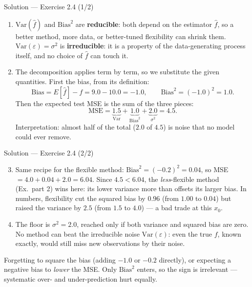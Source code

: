 \documentclass[aspectratio=169,11pt]{beamer}
\begin{document}
\begin{frame}{Solution --- Exercise 2.4 (1/2)}
\begin{solutionbox}
\begin{enumerate}
  \item $\mathrm{Var}(\hat f)$ and $\mathrm{Bias}^2$ are
        \textbf{reducible}: both depend on the estimator $\hat f$, so
        a better method, more data, or better-tuned flexibility can
        shrink them. $\mathrm{Var}(\varepsilon)=\sigma^2$ is
        \textbf{irreducible}: it is a property of the data-generating
        process itself, and no choice of $\hat f$ can touch it.
  \item The decomposition applies term by term, so we substitute the
        given quantities. First the bias, from its definition:
        \[
          \mathrm{Bias}=E[\hat f]-f=9.0-10.0=-1.0,
          \qquad \mathrm{Bias}^2=(-1.0)^2=1.0.
        \]
        Then the expected test MSE is the sum of the three pieces:
        \[
          \text{MSE}=\underbrace{1.5}_{\text{Var}}
          +\underbrace{1.0}_{\text{Bias}^2}
          +\underbrace{2.0}_{\sigma^2}=4.5.
        \]
        Interpretation: almost half of the total ($2.0$ of $4.5$) is
        noise that no model could ever remove.
\end{enumerate}
\end{solutionbox}
\end{frame}

\begin{frame}{Solution --- Exercise 2.4 (2/2)}
\begin{solutionbox}
\begin{enumerate}\setcounter{enumi}{2}
  \item Same recipe for the flexible method:
        $\mathrm{Bias}^2=(-0.2)^2=0.04$, so
        MSE $=4.0+0.04+2.0=6.04$. Since $4.5<6.04$, the
        \emph{less}-flexible method (Ex.\ part 2) wins here: its lower
        variance more than offsets its larger bias. In numbers,
        flexibility cut the squared bias by $0.96$ (from $1.00$ to
        $0.04$) but raised the variance by $2.5$ (from $1.5$ to
        $4.0$) --- a bad trade at this $x_0$.
  \item The floor is $\sigma^2=2.0$, reached only if both variance and
        squared bias are zero. No method can beat the irreducible
        noise $\mathrm{Var}(\varepsilon)$: even the true $f$, known
        exactly, would still miss new observations by their noise.
\end{enumerate}
\end{solutionbox}
\begin{mistake}
Forgetting to square the bias (adding $-1.0$
or $-0.2$ directly), or expecting a negative bias to \emph{lower} the
MSE. Only $\mathrm{Bias}^2$ enters, so the sign is irrelevant ---
systematic over- and under-prediction hurt equally.
\end{mistake}
\end{frame}
\end{document}
